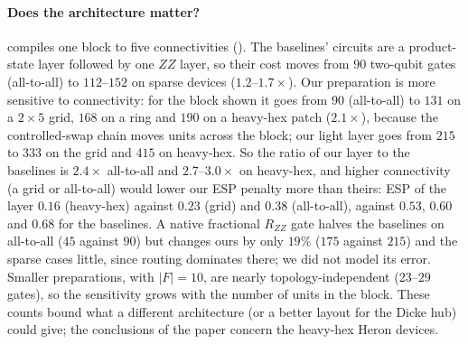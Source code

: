 
\paragraph{Does the architecture matter?}   compiles one block to five connectivities (). The baselines' circuits are a product-state layer followed by one $ZZ$ layer, so their cost moves from $90$ two-qubit gates (all-to-all) to $112$--$152$ on sparse devices ($1.2$--$1.7\times$). Our preparation is more sensitive to connectivity: for the block shown it goes from $90$ (all-to-all) to $131$ on a $2\times5$ grid, $168$ on a ring and $190$ on a heavy-hex patch ($2.1\times$), because the controlled-swap chain moves units across the block; our light layer goes from $215$ to $333$ on the grid and $415$ on heavy-hex. So the ratio of our layer to the baselines is $2.4\times$ all-to-all and $2.7$--$3.0\times$ on heavy-hex, and higher connectivity (a grid or all-to-all) would lower our ESP penalty more than theirs: ESP of the layer $0.16$ (heavy-hex) against $0.23$ (grid) and $0.38$ (all-to-all), against $0.53$, $0.60$ and $0.68$ for the baselines. A native fractional $R_{ZZ}$ gate halves the baselines on all-to-all ($45$ against $90$) but changes ours by only $19\%$ ($175$ against $215$) and the sparse cases little, since routing dominates there; we did not model its error. Smaller preparations, with $|F|=10$, are nearly topology-independent ($23$--$29$ gates), so the sensitivity grows with the number of units in the block. These counts bound what a different architecture (or a better layout for the Dicke hub) could give; the conclusions of the paper concern the heavy-hex Heron devices.
